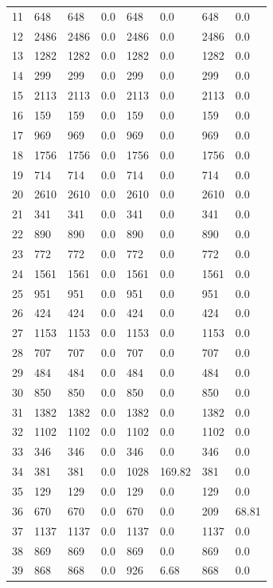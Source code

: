 \begin{longtable}{llllllll}
	11 & 648 & 648 & 0.0 & 648 & 0.0 & 648 & 0.0 \\
	12 & 2486 & 2486 & 0.0 & 2486 & 0.0 & 2486 & 0.0 \\
	13 & 1282 & 1282 & 0.0 & 1282 & 0.0 & 1282 & 0.0 \\
	14 & 299 & 299 & 0.0 & 299 & 0.0 & 299 & 0.0 \\
	15 & 2113 & 2113 & 0.0 & 2113 & 0.0 & 2113 & 0.0 \\
	16 & 159 & 159 & 0.0 & 159 & 0.0 & 159 & 0.0 \\
	17 & 969 & 969 & 0.0 & 969 & 0.0 & 969 & 0.0 \\
	18 & 1756 & 1756 & 0.0 & 1756 & 0.0 & 1756 & 0.0 \\
	19 & 714 & 714 & 0.0 & 714 & 0.0 & 714 & 0.0 \\
	20 & 2610 & 2610 & 0.0 & 2610 & 0.0 & 2610 & 0.0 \\
	21 & 341 & 341 & 0.0 & 341 & 0.0 & 341 & 0.0 \\
	22 & 890 & 890 & 0.0 & 890 & 0.0 & 890 & 0.0 \\
	23 & 772 & 772 & 0.0 & 772 & 0.0 & 772 & 0.0 \\
	24 & 1561 & 1561 & 0.0 & 1561 & 0.0 & 1561 & 0.0 \\
	25 & 951 & 951 & 0.0 & 951 & 0.0 & 951 & 0.0 \\
	26 & 424 & 424 & 0.0 & 424 & 0.0 & 424 & 0.0 \\
	27 & 1153 & 1153 & 0.0 & 1153 & 0.0 & 1153 & 0.0 \\
	28 & 707 & 707 & 0.0 & 707 & 0.0 & 707 & 0.0 \\
	29 & 484 & 484 & 0.0 & 484 & 0.0 & 484 & 0.0 \\
	30 & 850 & 850 & 0.0 & 850 & 0.0 & 850 & 0.0 \\
	31 & 1382 & 1382 & 0.0 & 1382 & 0.0 & 1382 & 0.0 \\
	32 & 1102 & 1102 & 0.0 & 1102 & 0.0 & 1102 & 0.0 \\
	33 & 346 & 346 & 0.0 & 346 & 0.0 & 346 & 0.0 \\
	34 & 381 & 381 & 0.0 & 1028 & 169.82 & 381 & 0.0 \\
	35 & 129 & 129 & 0.0 & 129 & 0.0 & 129 & 0.0 \\
	36 & 670 & 670 & 0.0 & 670 & 0.0 & 209 & 68.81 \\
	37 & 1137 & 1137 & 0.0 & 1137 & 0.0 & 1137 & 0.0 \\
	38 & 869 & 869 & 0.0 & 869 & 0.0 & 869 & 0.0 \\
	39 & 868 & 868 & 0.0 & 926 & 6.68 & 868 & 0.0 \\

\end{longtable}
